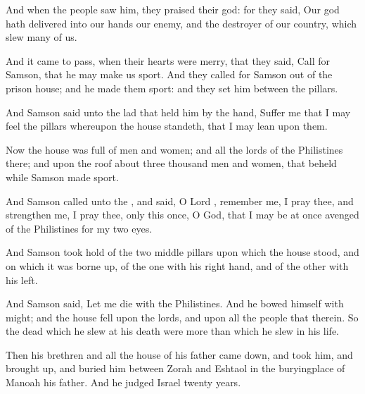 {And when the
people
saw him, they
praised their
god: for they
said, Our
god hath
delivered into our
hands our
enemy, and the
destroyer of our
country, which
slew
many of us.

And it came to pass, when their
hearts were
merry, that they
said,
Call for
Samson, that he may make us
sport. And they
called for
Samson out of the
prison
house; and he made
them
sport: and they
set him between the
pillars.

And
Samson
said unto the
lad that
held him by the
hand,
Suffer me that I may
feel the
pillars whereupon the
house
standeth, that I may
lean upon them.

Now the
house was
full of
men and
women; and all the
lords of the
Philistines
{} there; and
{} upon the
roof about
three
thousand
men and
women, that
beheld while
Samson made
sport.

And
Samson
called unto the
{}, and
said, O
Lord
{},
remember me, I pray thee, and
strengthen me, I pray thee, only this
once, O
God, that I may be at
once
avenged of the
Philistines for my
two
eyes.

And
Samson took
hold of the
two
middle
pillars upon which the
house
stood, and on which it was borne
up, of the
one with his right
hand, and of the
other with his
left.

And
Samson
said, Let me
die with the
Philistines. And he
bowed himself with
{}
might; and the
house
fell upon the
lords, and upon all the
people that
{} therein. So the
dead which he
slew at his
death were
more than
{} which he
slew in his
life.

Then his
brethren and all the
house of his
father came
down, and
took him, and brought
{}
up, and
buried him between
Zorah and
Eshtaol in the
buryingplace of
Manoah his
father. And he
judged
Israel
twenty
years.




\par }
